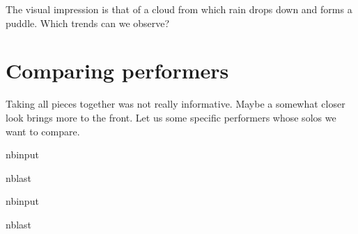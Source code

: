 \documentclass[letterpaper,10pt,english]{sphinxmanual}
\begin{document}
\sphinxAtStartPar
The visual impression is that of a cloud from which rain drops down and forms a puddle. Which trends can we observe?


\section{Comparing performers}
\label{\detokenize{04_jazz_solos:Comparing-performers}}
\sphinxAtStartPar
Taking all pieces together was not really informative. Maybe a somewhat closer look brings more to the front. Let us some specific performers whose solos we want to compare.

\begin{sphinxuseclass}{nbinput}
\begin{sphinxuseclass}{nblast}
{
\begin{sphinxVerbatim}[commandchars=\\\{\}]
\llap{\color{nbsphinxin}[76]:\,\hspace{\fboxrule}\hspace{\fboxsep}}  \PYG{p}{[}     \PYG{p}{]}
\end{sphinxVerbatim}
}

\end{sphinxuseclass}
\end{sphinxuseclass}
\begin{sphinxuseclass}{nbinput}
\begin{sphinxuseclass}{nblast}
{
\begin{sphinxVerbatim}[commandchars=\\\{\}]
\llap{\color{nbsphinxin}[78]:\,\hspace{\fboxrule}\hspace{\fboxsep}}  
\end{sphinxVerbatim}
}

\end{sphinxuseclass}
\end{sphinxuseclass}
\end{document}
